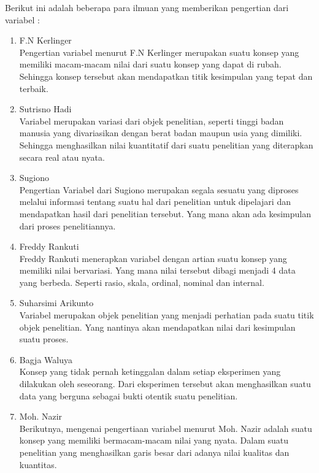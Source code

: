 Berikut ini adalah beberapa para ilmuan yang memberikan pengertian dari variabel :
\begin{enumerate}
    \item F.N Kerlinger\\
Pengertian variabel menurut F.N Kerlinger merupakan suatu konsep yang memiliki macam-macam nilai dari suatu konsep yang dapat di rubah. Sehingga konsep tersebut akan mendapatkan titik kesimpulan yang tepat dan terbaik. \cite{FNKerlinger}

    \item Sutrisno Hadi\\
Variabel merupakan variasi dari objek penelitian, seperti tinggi badan manusia yang divariasikan dengan berat badan maupun usia yang dimiliki. Sehingga menghasilkan nilai kuantitatif dari suatu penelitian yang diterapkan secara real atau nyata.

    \item Sugiono\\
Pengertian Variabel dari Sugiono merupakan segala sesuatu yang diproses melalui informasi tentang suatu hal dari penelitian untuk dipelajari dan mendapatkan hasil dari penelitian tersebut. Yang mana akan ada kesimpulan dari proses penelitiannya.

    \item Freddy Rankuti\\
Freddy Rankuti menerapkan variabel dengan artian suatu konsep yang memiliki nilai bervariasi. Yang mana nilai tersebut dibagi menjadi 4 data yang berbeda. Seperti rasio, skala, ordinal, nominal dan internal.

    \item Suharsimi Arikunto\\
Variabel merupakan objek penelitian yang menjadi perhatian pada suatu titik objek penelitian. Yang nantinya akan mendapatkan nilai dari kesimpulan suatu proses.

    \item Bagja Waluya\\
Konsep yang tidak pernah ketinggalan dalam setiap eksperimen yang dilakukan oleh seseorang. Dari eksperimen tersebut akan menghasilkan suatu data yang berguna sebagai bukti otentik suatu penelitian.

    \item Moh. Nazir\\
Berikutnya, mengenai pengertiaan variabel menurut Moh. Nazir adalah suatu konsep yang memiliki bermacam-macam nilai yang nyata. Dalam suatu penelitian yang menghasilkan garis besar dari adanya nilai kualitas dan kuantitas.


\end{enumerate}
